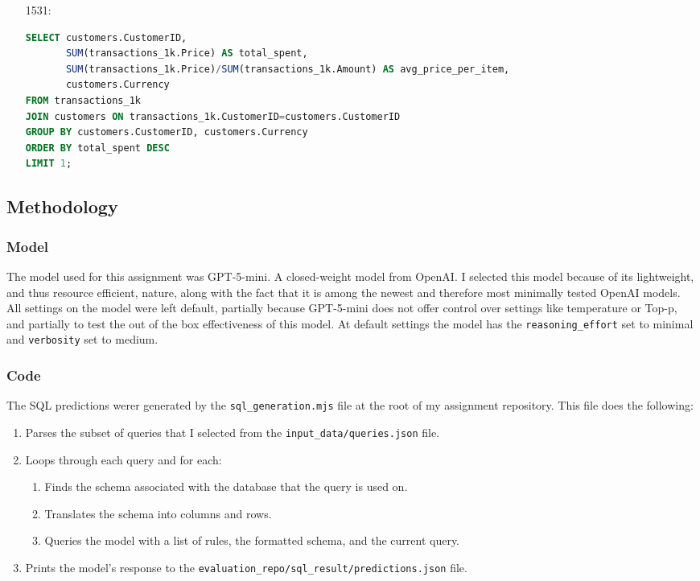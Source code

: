\documentclass[11pt]{article}
\begin{document}
\begin{enumerate}
\item[1531:]
\begin{adjustbox}{max width=\textwidth}
\begin{lstlisting}[language=SQL]
SELECT customers.CustomerID,
       SUM(transactions_1k.Price) AS total_spent,
       SUM(transactions_1k.Price)/SUM(transactions_1k.Amount) AS avg_price_per_item,
       customers.Currency
FROM transactions_1k
JOIN customers ON transactions_1k.CustomerID=customers.CustomerID
GROUP BY customers.CustomerID, customers.Currency
ORDER BY total_spent DESC
LIMIT 1;
\end{lstlisting}
\end{adjustbox}

\end{enumerate}


\subsection{Methodology}

\subsubsection{Model}
The model used for this assignment was GPT-5-mini. A closed-weight model from OpenAI. I selected this model because of its lightweight, and thus resource efficient, nature, along with the fact that it is among the newest and therefore most minimally tested OpenAI models. All settings on the model were left default, partially because GPT-5-mini does not offer control over settings like temperature or Top-p, and partially to test the out of the box effectiveness of this model. At default settings the model has the \texttt{reasoning\_effort} set to minimal and \texttt{verbosity} set to medium.


\subsubsection{Code}
The SQL predictions werer generated by the \texttt{sql\_generation.mjs} file at the root of my assignment repository. This file does the following:
\begin{enumerate}
\item Parses the subset of queries that I selected from the \texttt{input\_data/queries.json} file. 
\item Loops through each query and for each:
\begin{enumerate}
\item Finds the schema associated with the database that the query is used on.
\item Translates the schema into columns and rows.
\item Queries the model with a list of rules, the formatted schema, and the current query.
\end{enumerate}
\item Prints the model's response to the \texttt{evaluation\_repo/sql\_result/predictions.json} file.
\end{enumerate}
\end{document}
